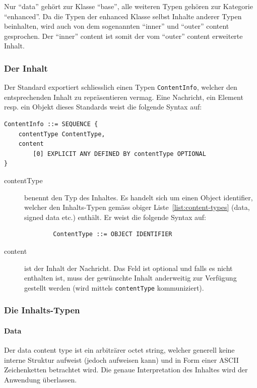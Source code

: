 \documentclass[10pt,a4paper]{article}
\begin{document}
Nur "`data"' gehört zur Klasse "`base"', alle weiteren Typen gehören zur Kategorie
"`enhanced"'. Da die Typen der enhanced Klasse selbst Inhalte anderer Typen beinhalten,
wird auch von dem sogenannten "`inner"' und "`outer"' content gesprochen. Der "`inner"'
content ist somit der vom "`outer"' content erweiterte Inhalt.

\subsubsection{Der Inhalt}

Der Standard exportiert schliesslich einen Typen \texttt{ContentInfo}, welcher den
entsprechenden Inhalt zu repräsentieren vermag. Eine Nachricht, ein Element resp. ein
Objekt dieses Standards weist die folgende Syntax auf:

\begin{verbatim}
ContentInfo ::= SEQUENCE {
    contentType ContentType,
    content
        [0] EXPLICIT ANY DEFINED BY contentType OPTIONAL
}
\end{verbatim}

\begin{description}
    \item[contentType] benennt den Typ des Inhaltes. Es handelt sich um einen Object
        identifier, welcher den Inhalts-Typen gemäss obiger Liste~\ref{list:content-types}
        (data, signed data etc.) enthält. Er weist die folgende Syntax auf:
        \begin{verbatim}
        ContentType ::= OBJECT IDENTIFIER
        \end{verbatim}
    \item[content] ist der Inhalt der Nachricht. Das Feld ist optional und falls es nicht
        enthalten ist, muss der gewünschte Inhalt anderweitig zur Verfügung gestellt
        werden (wird mittels \texttt{contentType} kommuniziert).
\end{description}

\subsubsection{Die Inhalts-Typen}

\paragraph{Data}
Der data content type ist ein arbiträrer octet string, welcher generell keine interne
Struktur aufweist (jedoch aufweisen kann) und in Form einer ASCII Zeichenketten betrachtet
wird. Die genaue Interpretation des Inhaltes wird der Anwendung überlassen.
\end{document}
